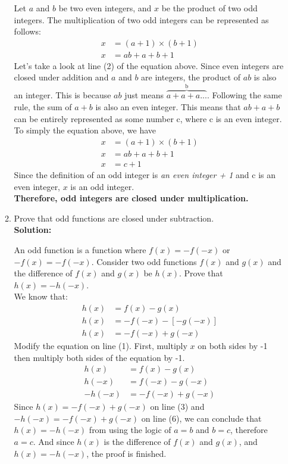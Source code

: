\documentclass[12pt]{book}
\begin{document}
\begin{enumerate}
\begin{enumerate}
Let $a$ and $b$ be two even integers, and $x$ be the product of two odd integers. The multiplication of two odd integers can be represented as follows:
\setcounter{equation}{0}
\begin{align}
    x &= (a + 1) \times (b + 1)\\
    x &= ab + a + b + 1
\end{align}
Let's take a look at line (2) of the equation above. Since even integers are closed under addition and $a$ and $b$ are integers, the product of $ab$ is also an integer. This is because $ab$ just means 
$\overbrace{a + a + a... }^\text{b}$. Following the same rule, the sum of $a + b$ is also an even integer. This means that $ab + a + b$ can be entirely represented as some number c, where c is an even integer.\\
To simply the equation above, we have
\setcounter{equation}{0}
\begin{align}
    x &= (a + 1) \times (b + 1)\\
    x &= ab + a + b + 1\\
    x &= c + 1
\end{align}
Since the definition of an odd integer is \textit{an even integer + 1} and c is an even integer, $x$ is an odd integer.\\

\textbf{Therefore, odd integers are closed under multiplication.}

\item Prove that odd functions are closed under subtraction.\\

\textbf{Solution:}

An odd function is a function where $f(x) = -f(-x)$ or $-f(x) = -f(-x)$. Consider two odd functions $f(x)$ and $g(x)$ and the difference of $f(x)$ and $g(x)$ be $h(x)$. Prove that $h(x) = -h(-x)$.\\

We know that:
\setcounter{equation}{0}
\begin{align}
    h(x) &= f(x) - g(x)\\
    h(x) &= -f(-x) - [-g(-x)]\\
    h(x) &= -f(-x) + g(-x)
\end{align}
Modify the equation on line (1). First, multiply $x$ on both sides by -1 then multiply both sides of the equation by -1.
\begin{align}
    h(x) &= f(x) - g(x)\\
    h(-x) &= f(-x) - g(-x)\\
    -h(-x) &= -f(-x) + g(-x)
\end{align}
Since $h(x) = -f(-x) + g(-x)$ on line (3) and $-h(-x) = -f(-x) + g(-x)$ on line (6), we can conclude that $h(x) = -h(-x)$ from using the logic of $a = b$ and $b = c$, therefore $a = c$. And since $h(x)$ is the difference of $f(x)$ and $g(x)$, and $h(x) = -h(-x)$, the proof is finished.\\


\end{enumerate}
\end{enumerate}
\end{document}
